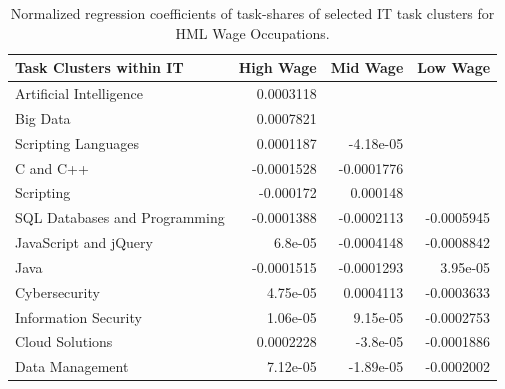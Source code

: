 \documentclass[letterpaper]{article} %
\begin{document}
\begin{table}[h!]
\centering
\scriptsize
\begin{tabular}{l | r | r | r}
                         Task Clusters within IT &   High Wage &    Mid Wage &    Low Wage \\
\hline
\hline
       Artificial Intelligence &   0.0003118 &             &              \\
                      Big Data &   0.0007821 &             &              \\
           Scripting Languages &   0.0001187 &   -4.18e-05 &              \\
                     C and C++ &  -0.0001528 &  -0.0001776 &              \\
                     Scripting &   -0.000172 &    0.000148 &              \\
 SQL Databases and Programming &  -0.0001388 &  -0.0002113 &  -0.0005945 \\
         JavaScript and jQuery &     6.8e-05 &  -0.0004148 &  -0.0008842 \\
                          Java &  -0.0001515 &  -0.0001293 &    3.95e-05 \\
                 Cybersecurity &    4.75e-05 &   0.0004113 &  -0.0003633 \\
          Information Security &    1.06e-05 &    9.15e-05 &  -0.0002753 \\
               Cloud Solutions &   0.0002228 &    -3.8e-05 &  -0.0001886 \\
               Data Management &    7.12e-05 &   -1.89e-05 &  -0.0002002 \\
\hline
\end{tabular}
\caption{Normalized regression coefficients of task-shares of selected IT task clusters for HML Wage Occupations. 
\label{table:IT_HML_coeff} }
\end{table}


\end{document}
